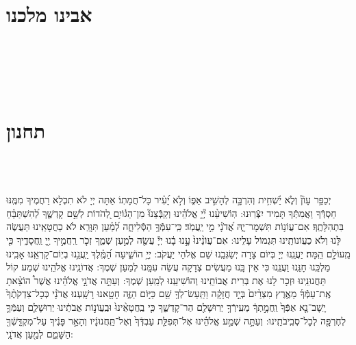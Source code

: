 \documentclass[twoside, openany, parskip=half, 11pt]{book}
\begin{document}
\section[אבינו מלכנו]{ אבינו מלכנו }
\label{avinu malkeinu}

\\


\avinumalkeinu

\vfill
{} \pageref{tachanun mon thurs}\\
 \pageref{nefilas_apayim}\\
\sepline

\clearpage

\section[תחנון]{ תחנון }
\label{tachanun mon thurs}
\\
 \pageref{nefilas_apayim}\\


 יְכַפֵּ֥ר עָוֹן֘ וְלֹ֢א יַ֫שְׁחִ֥ית וְהִרְבָּ֣ה לְהָשִׁ֣יב אַפּ֑וֹ וְלֹ֣א יָ֝עִ֗יר כָּל־חֲמָתֽוֹ׃ אַתָּה יְיָ לֹא תִכְלָא רַחֲמֶיךָ מִמֶּֽנּוּ חַסְדְּֿךָ וַאֲמִתְּֿךָ תָּמִיד יִצְּֿרֽוּנוּ: 
 הֽוֹשִׁיעֵ֨נוּ יְ֘יָ֤ אֱלֹהֵ֗ינוּ וְקַבְּֿצֵנוּ֘ מִן־הַגּ֫וֹיִ֥ם לְ֭הֹדוֹת לְשֵׁ֣ם קָדְשֶׁ֑ךָ לְ֝הִשְׁתַּבֵּ֗חַ בִּתְהִלָּתֶֽךָ׃
 אִם־עֲוֹנ֥וֹת תִּשְׁמָר־יָ֑הּ אֲ֝דֹנָ֗י מִ֣י יַֽעֲמֹֽד׃ כִּֽי־עִמְּֿךָ֥ הַסְּֿלִיחָ֑ה לְ֝מַ֗עַן תִּוָּרֵֽא׃ לֹא כַחֲטָאֵֽינוּ תַּעֲשֶׂה לָּנוּ וְלֹא כַעֲוֹנוֹתֵֽינוּ תִּגְמוֹל עָלֵינוּ:
 אִם־עֲוֹנֵ֨ינוּ֙ עָ֣נוּ בָ֔נוּ יְיָ֕ עֲשֵׂ֖ה לְמַ֣עַן שְׁמֶ֑ךָ
  זְכֹ֤ר
   רַֽחֲמֶ֣יךָ יְ֖יָ וַֽחֲסָדֶ֑יךָ כִּ֖י מֵֽעוֹלָ֣ם הֵֽמָּה׃
 יַעֲנֵֽנוּ יְיָ בְּיוֹם צָרָה יְשַׂגְּבֵֽנוּ שֵׁם אֱלֹהֵי יַעֲקֹב:
 יְיָ֥ הוֹשִׁ֑יעָה הַ֝מֶּֽ֗לֶךְ יַֽעֲנֵ֥נוּ בְיֽוֹם־קָרְאֵֽנוּ׃
 אָבִֽינוּ מַלְכֵּֽנוּ חָנֵּֽנוּ וַעֲנֵֽנוּ כִּי אֵין בָּֽנוּ מַעֲשִׂים צְדָקָה עֲשֵׂה עִמָּֽנוּ לְמַעַן שְׁמֶךָ:
 אֲדוֹנֵֽינוּ אֱלֹהֵֽינוּ שְׁמַע קוֹל תַּחֲנוּנֵֽינוּ וּזְכָר לָנוּ אֶת בְּרִית אֲבוֹתֵֽינוּ וְהוֹשִׁיעֵֽנוּ לְמַֽעַן שְׁמֶךָ:
 וְעַתָּ֣ה אֲדֹנָ֣י אֱלֹהֵ֗ינוּ אֲשֶׁר֩ הוֹצֵ֨אתָ אֶֽת־עַמְּֿךָ֜ מֵאֶ֤רֶץ מִצְרַ֨יִם֙ בְּיָ֣ד חֲזָקָ֔ה וַתַּֽעַשׂ־לְךָ֥ שֵׁ֖ם כַּיּ֣וֹם הַזֶּ֑ה חָטָ֖אנוּ רָשָֽׁעְנוּ׃
 אֲדֹנָ֗י כְּכָל־צִדְקֹתֶ֨ךָ֙ יָֽשָׁב־נָ֤א אַפְּֿךָ֙ וַֽחֲמָ֣תְךָ֔ מֵעִֽירְֿךָ֥ יְרֽוּשָׁלַ֖ם הַר־קָדְשֶׁ֑ךָ כִּ֤י בַֽחֲטָאֵ֨ינוּ֙ וּבַֽעֲוֹנ֣וֹת אֲבֹתֵ֔ינוּ יְרֽוּשָׁלַ֧ם וְעַמְּֿךָ֛ לְחֶרְפָּ֖ה לְכָל־סְבִֽיבֹתֵֽינוּ:
 וְעַתָּ֣ה שְׁמַ֣ע אֱלֹהֵ֗ינוּ אֶל־תְּפִלַּ֤ת עַבְדְּֿךָ֙ וְאֶל־תַּֽחֲנוּנָ֔יו וְהָאֵ֣ר פָּנֶ֔יךָ עַל־מִקְדָּֽשְֿׁךָ֖ הַשָּׁמֵ֑ם לְמַ֖עַן אֲדֹנָֽי:
\end{document}
